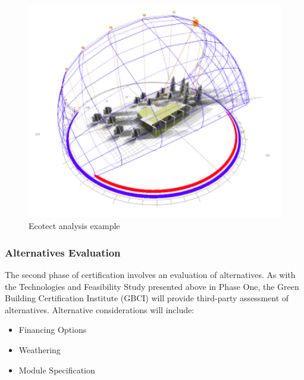 \begin{figure}
\begin{center}
\includegraphics[scale=0.7]{pics/julie_pic_1.png}
\caption{Ecotect analysis example}
\label{juliefig1}
\end{center}
\end{figure}


\subsubsection{Alternatives Evaluation}
The second phase of certification involves an evaluation of alternatives. As with the Technologies and Feasibility Study presented above in Phase One, the Green Building Certification Institute (GBCI) will provide third-party assessment of alternatives. Alternative considerations will include:

\begin{itemize}
\item Financing Options
\item Weathering
\item Module Specification
\end{itemize}

